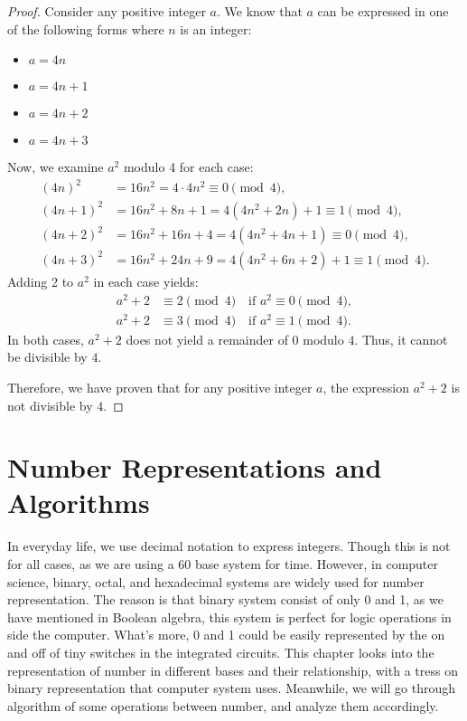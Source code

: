     \begin{proof}
        Consider any positive integer $a$. We know that $a$ can be expressed in one of the following forms where $n$ is an integer:
        \begin{itemize}
            \item $a = 4n$
            \item $a = 4n + 1$
            \item $a = 4n + 2$
            \item $a = 4n + 3$
        \end{itemize}
        Now, we examine $a^2$ modulo 4 for each case:
        \begin{align*}
            (4n)^2 &= 16n^2 = 4 \cdot 4n^2 \equiv 0 \pmod{4}, \\
            (4n + 1)^2 &= 16n^2 + 8n + 1 = 4(4n^2 + 2n) + 1 \equiv 1 \pmod{4}, \\
            (4n + 2)^2 &= 16n^2 + 16n + 4 = 4(4n^2 + 4n + 1) \equiv 0 \pmod{4}, \\
            (4n + 3)^2 &= 16n^2 + 24n + 9 = 4(4n^2 + 6n + 2) + 1 \equiv 1 \pmod{4}.
        \end{align*}
        Adding 2 to $a^2$ in each case yields:
        \begin{align*}
            a^2 + 2 &\equiv 2 \pmod{4} \quad \text{if } a^2 \equiv 0 \pmod{4}, \\
            a^2 + 2 &\equiv 3 \pmod{4} \quad \text{if } a^2 \equiv 1 \pmod{4}.
        \end{align*}
        In both cases, $a^2 + 2$ does not yield a remainder of $0$ modulo $4$. Thus, it cannot be divisible by $4$.

        Therefore, we have proven that for any positive integer $a$, the expression $a^2 + 2$ is not divisible by $4$.
    \end{proof}


    \section{Number Representations and Algorithms}
    In everyday life, we use decimal notation to express integers. Though this is not
    for all cases, as we are using a 60 base system for time. However, in computer science, binary, octal, and hexadecimal
    systems are widely used for number representation. The reason is that binary system consist of 
    only 0 and 1, as we have mentioned in Boolean algebra, this system is perfect for logic operations
    in side the computer. What's more, 0 and 1 could be easily represented by the on and off of tiny
    switches in the integrated circuits. This chapter looks into the representation of number
    in different bases and their relationship, with a tress on binary representation that computer
    system uses. Meanwhile, we will go through algorithm of some operations between number, and
    analyze them accordingly.
